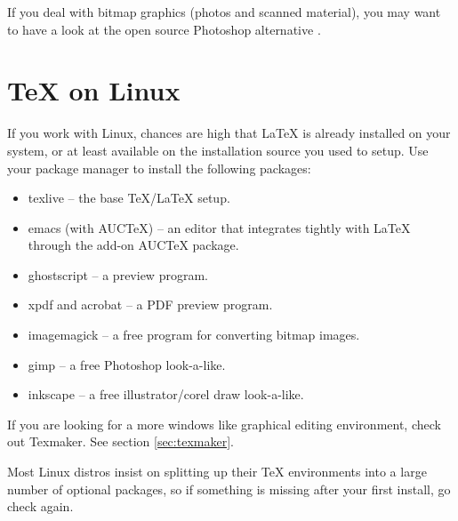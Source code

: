 If you deal with bitmap graphics (photos and scanned material), you may want
to have a look at the open source Photoshop alternative  \cite{gimp}.

\section{\TeX{} on Linux}

If you work with Linux, chances are high that \LaTeX{} is already installed
on your system, or at least available on the installation source you used to
setup. Use your package manager to install the following packages:

\begin{itemize}
\item texlive -- the base \TeX{}/\LaTeX{} setup.
\item emacs (with AUCTeX) -- an editor that integrates tightly with \LaTeX{} through the add-on AUCTeX package.
\item ghostscript -- a \PSi{} preview program.
\item xpdf and acrobat -- a PDF preview program.
\item imagemagick -- a free program for converting bitmap images.
\item gimp -- a free Photoshop look-a-like.
\item inkscape -- a free illustrator/corel draw look-a-like.
\end{itemize}

If you are looking for a more windows like graphical editing environment,
check out Texmaker. See section \ref{sec:texmaker}.

Most Linux distros insist on splitting up their \TeX{} environments into a
large number of optional packages, so if something is missing after your
first install, go check again.
